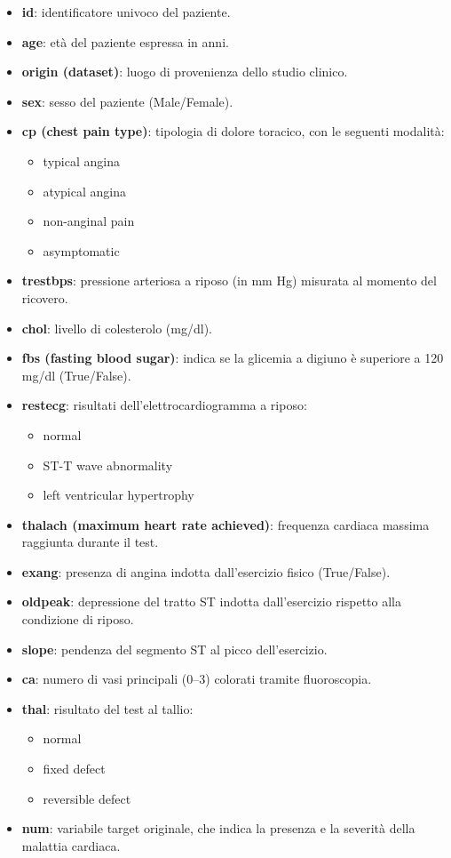 \documentclass[12pt]{article}
\begin{document}
{\small
\begin{itemize}
    \item \textbf{id}: identificatore univoco del paziente.
    \item \textbf{age}: età del paziente espressa in anni.
    \item \textbf{origin (dataset)}: luogo di provenienza dello studio clinico.
    \item \textbf{sex}: sesso del paziente (Male/Female).
    \item \textbf{cp (chest pain type)}: tipologia di dolore toracico, con le seguenti modalità:
    \begin{itemize}
        \item typical angina
        \item atypical angina
        \item non-anginal pain
        \item asymptomatic
    \end{itemize}
    \item \textbf{trestbps}: pressione arteriosa a riposo (in mm Hg) misurata al momento del ricovero.
    \item \textbf{chol}: livello di colesterolo (mg/dl).
    \item \textbf{fbs (fasting blood sugar)}: indica se la glicemia a digiuno è superiore a 120 mg/dl (True/False).
    \newpage \item  \textbf{restecg}: risultati dell’elettrocardiogramma a riposo:
    \begin{itemize}
        \item normal
        \item ST-T wave abnormality
        \item left ventricular hypertrophy
    \end{itemize}
    \item \textbf{thalach (maximum heart rate achieved)}: frequenza cardiaca massima raggiunta durante il test.
    \item \textbf{exang}: presenza di angina indotta dall’esercizio fisico (True/False).
    \item \textbf{oldpeak}: depressione del tratto ST indotta dall’esercizio rispetto alla condizione di riposo.
    \item \textbf{slope}: pendenza del segmento ST al picco dell’esercizio.
    \item \textbf{ca}: numero di vasi principali (0–3) colorati tramite fluoroscopia.
    \item \textbf{thal}: risultato del test al tallio:
    \begin{itemize}
        \item normal
        \item fixed defect
        \item reversible defect
    \end{itemize}
    \item \textbf{num}: variabile target originale, che indica la presenza e la severità della malattia cardiaca.
\end{itemize}
}
\newpage
\end{document}
